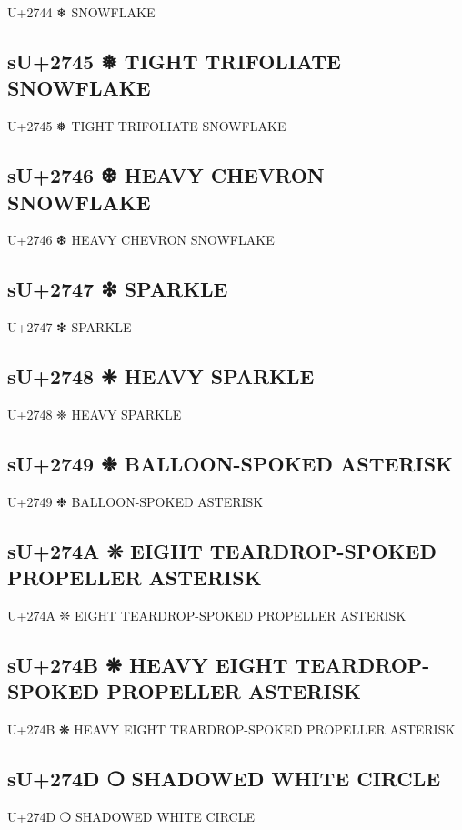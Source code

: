 U+2744 ❄ SNOWFLAKE

\subsection{sU+2745 ❅ TIGHT TRIFOLIATE SNOWFLAKE}

U+2745 ❅ TIGHT TRIFOLIATE SNOWFLAKE

\subsection{sU+2746 ❆ HEAVY CHEVRON SNOWFLAKE}

U+2746 ❆ HEAVY CHEVRON SNOWFLAKE

\subsection{sU+2747 ❇ SPARKLE}

U+2747 ❇ SPARKLE

\subsection{sU+2748 ❈ HEAVY SPARKLE}

U+2748 ❈ HEAVY SPARKLE

\subsection{sU+2749 ❉ BALLOON-SPOKED ASTERISK}

U+2749 ❉ BALLOON-SPOKED ASTERISK

\subsection{sU+274A ❊ EIGHT TEARDROP-SPOKED PROPELLER ASTERISK}

U+274A ❊ EIGHT TEARDROP-SPOKED PROPELLER ASTERISK

\subsection{sU+274B ❋ HEAVY EIGHT TEARDROP-SPOKED PROPELLER ASTERISK}

U+274B ❋ HEAVY EIGHT TEARDROP-SPOKED PROPELLER ASTERISK

\subsection{sU+274D ❍ SHADOWED WHITE CIRCLE}

U+274D ❍ SHADOWED WHITE CIRCLE

